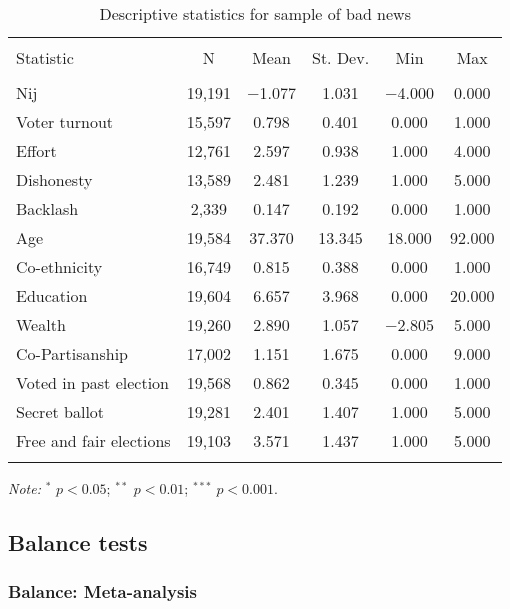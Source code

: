 \documentclass[]{article}
\begin{document}
\begin{table}[htb] \centering 
  \caption{Descriptive statistics for sample of bad news} 
  \label{} 
\begin{tabular}{@{\extracolsep{1pt}}lccccc} 
\\[-1.8ex]\hline 
\hline \\[-1.8ex] 
Statistic & \multicolumn{1}{c}{N} & \multicolumn{1}{c}{Mean} & \multicolumn{1}{c}{St. Dev.} & \multicolumn{1}{c}{Min} & \multicolumn{1}{c}{Max} \\ 
\hline \\[-1.8ex] 
Nij & 19,191 & $-$1.077 & 1.031 & $-$4.000 & 0.000 \\ 
Voter turnout & 15,597 & 0.798 & 0.401 & 0.000 & 1.000 \\ 
Effort & 12,761 & 2.597 & 0.938 & 1.000 & 4.000 \\ 
Dishonesty & 13,589 & 2.481 & 1.239 & 1.000 & 5.000 \\ 
Backlash & 2,339 & 0.147 & 0.192 & 0.000 & 1.000 \\ 
Age & 19,584 & 37.370 & 13.345 & 18.000 & 92.000 \\ 
Co-ethnicity & 16,749 & 0.815 & 0.388 & 0.000 & 1.000 \\ 
Education & 19,604 & 6.657 & 3.968 & 0.000 & 20.000 \\ 
Wealth & 19,260 & 2.890 & 1.057 & $-$2.805 & 5.000 \\ 
Co-Partisanship & 17,002 & 1.151 & 1.675 & 0.000 & 9.000 \\ 
Voted in past election & 19,568 & 0.862 & 0.345 & 0.000 & 1.000 \\ 
Secret ballot & 19,281 & 2.401 & 1.407 & 1.000 & 5.000 \\ 
Free and fair elections & 19,103 & 3.571 & 1.437 & 1.000 & 5.000 \\ 
\hline \\[-1.8ex] 
\end{tabular} 
\begin{flushleft}\textit{Note:}  $^*$ $p<0.05$; $^{**}$ $p<0.01$; $^{***}$ $p<0.001$. \end{flushleft}
\end{table}

\clearpage

\subsection{Balance tests}\label{balance-tests}

\subsubsection{Balance: Meta-analysis}\label{balance-meta-analysis}
\end{document}
